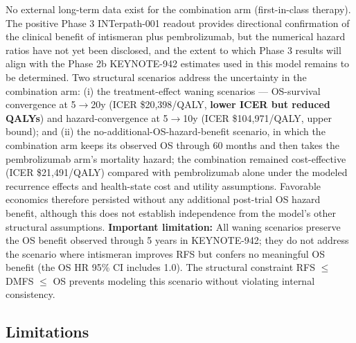 \documentclass[12pt,a4paper]{article}
\begin{document}
No external long-term data exist for the combination arm (first-in-class therapy). The positive Phase 3 \mbox{INTerpath-001} readout provides directional confirmation of the clinical benefit of intismeran plus \mbox{pembrolizumab}, but the numerical hazard ratios have not yet been disclosed, and the extent to which Phase 3 results will align with the Phase 2b \mbox{KEYNOTE-942} estimates used in this model remains to be determined. Two structural scenarios address the uncertainty in the combination arm: (i) the treatment-effect waning scenarios --- OS-survival convergence at 5$\to$20y (ICER \$20,398/QALY, \textbf{lower ICER but reduced QALYs}) and hazard-convergence at 5$\to$10y (ICER \$104,971/QALY, upper bound); and (ii) the no-additional-OS-hazard-benefit scenario, in which the combination arm keeps its observed OS through 60 months and then takes the \mbox{pembrolizumab} arm's mortality hazard; the combination remained cost-effective (ICER \$21,491/QALY) compared with \mbox{pembrolizumab} alone under the modeled recurrence effects and health-state cost and utility assumptions. Favorable economics therefore persisted without any additional post-trial OS hazard benefit, although this does not establish independence from the model's other structural assumptions. \textbf{Important limitation:} All waning scenarios preserve the OS benefit observed through 5 years in KEYNOTE-942; they do not address the scenario where intismeran improves RFS but confers no meaningful OS benefit (the OS HR 95\% CI includes 1.0). The structural constraint RFS $\leq$ DMFS $\leq$ OS prevents modeling this scenario without violating internal consistency.

\subsection{Limitations}
\end{document}
